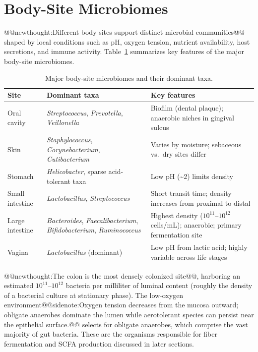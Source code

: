 \documentclass{tufte-handout}
\makeatletter
\def\newthought#1{@@newthought:#1@@}
\def\sidenote#1{@@sidenote:#1@@}
\makeatother
\begin{document}
\section{Body-Site Microbiomes}

\newthought{Different body sites support distinct microbial communities} shaped by local conditions such as pH, oxygen tension, nutrient availability, host secretions, and immune activity. Table~\ref{tab:body-sites} summarizes key features of the major body-site microbiomes.

\begin{table}[ht]
\caption{Major body-site microbiomes and their dominant taxa.}\label{tab:body-sites}
\begin{tabular}{p{2.2cm}p{3cm}p{3.5cm}}
\toprule
\textbf{Site} & \textbf{Dominant taxa} & \textbf{Key features} \\ \midrule
Oral cavity & \textit{Streptococcus}, \textit{Prevotella}, \textit{Veillonella} & Biofilm (dental plaque); anaerobic niches in gingival sulcus \\
Skin & \textit{Staphylococcus}, \textit{Corynebacterium}, \textit{Cutibacterium} & Varies by moisture; sebaceous vs.\ dry sites differ \\
Stomach & \textit{Helicobacter}, sparse acid-tolerant taxa & Low pH (\textasciitilde2) limits density \\
Small intestine & \textit{Lactobacillus}, \textit{Streptococcus} & Short transit time; density increases from proximal to distal \\
Large intestine & \textit{Bacteroides}, \textit{Faecalibacterium}, \textit{Bifidobacterium}, \textit{Ruminococcus} & Highest density ($10^{11}$--$10^{12}$ cells/mL); anaerobic; primary fermentation site \\
Vagina & \textit{Lactobacillus} (dominant) & Low pH from lactic acid; highly variable across life stages \\ \bottomrule
\end{tabular}
\end{table}

\newthought{The colon is the most densely colonized site}, harboring an estimated $10^{11}$--$10^{12}$ bacteria per milliliter of luminal content (roughly the density of a bacterial culture at stationary phase). The low-oxygen environment\sidenote{Oxygen tension decreases from the mucosa outward; obligate anaerobes dominate the lumen while aerotolerant species can persist near the epithelial surface.} selects for obligate anaerobes, which comprise the vast majority of gut bacteria. These are the organisms responsible for fiber fermentation and SCFA production discussed in later sections.
\end{document}

